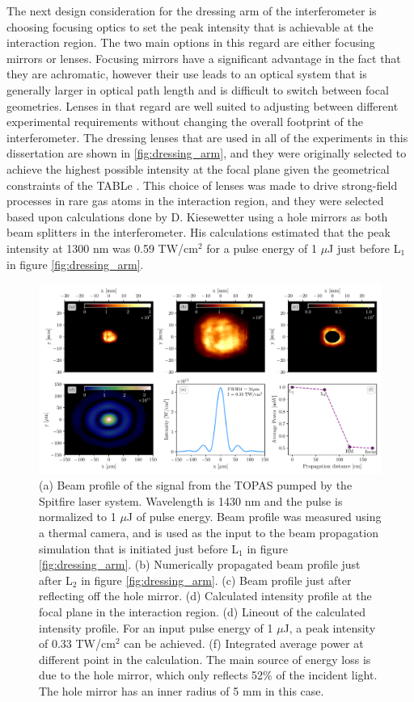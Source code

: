 The next design consideration for the dressing arm of the interferometer is choosing focusing optics to set the peak intensity that is achievable at the interaction region.  The two main options in this regard are either focusing mirrors or lenses.  Focusing mirrors have a significant advantage in the fact that they are achromatic, however their use leads to an optical system that is generally larger in optical path length and is difficult to switch between focal geometries. Lenses in that regard are well suited to adjusting between different experimental requirements without changing the overall footprint of the interferometer.  The dressing lenses that are used in all of the experiments in this dissertation are shown in \ref{fig:dressing_arm}, and they were originally selected to achieve the highest possible intensity at the focal plane given the geometrical constraints of the TABLe \cite{kiesewetterDynamicsNearThresholdAttosecond2019}. This choice of lenses was made to drive strong-field processes in rare gas atoms in the interaction region, and they were selected based upon calculations done by D. Kiesewetter using a hole mirrors as both beam splitters in the interferometer. His calculations estimated that the peak intensity at 1300 nm was 0.59 TW/cm$^2$ for a pulse energy of 1 $\mu$J just before L$_1$ in figure \ref{fig:dressing_arm}.

\begin{figure}%
	\includegraphics[width=\textwidth]{figures/Beamline/pump_intensity_profiles_1430nm_1uj.pdf}
	\caption{(a) Beam profile of the signal from the TOPAS pumped by the Spitfire laser system.  Wavelength is 1430 nm and the pulse is normalized to 1 $\mu$J of pulse energy.  Beam profile was measured using a thermal camera, and is used as the input to the beam propagation simulation that is initiated just before L$_1$ in figure \ref{fig:dressing_arm}. (b) Numerically propagated beam profile just after L$_2$ in figure \ref{fig:dressing_arm}. (c) Beam profile just after reflecting off the hole mirror.  (d) Calculated intensity profile at the focal plane in the interaction region. (d) Lineout of the calculated intensity profile.  For an input pulse energy of 1 $\mu$J, a peak intensity of 0.33 TW/cm$^2$ can be achieved.  (f) Integrated average power at different point in the calculation.  The main source of energy loss is due to the hole mirror, which only reflects 52\% of the incident light.  The hole mirror has an inner radius of 5 mm in this case.}
	\label{fig:dressing_intensity}
\end{figure}


